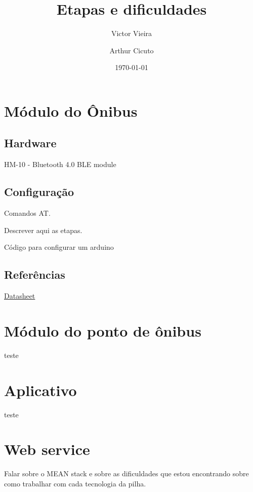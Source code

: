 \documentclass[a4paper, 12pt]{article}
\title{Etapas e dificuldades}
\author{Victor Vieira}
\author{Arthur Cicuto}
\date{\today}
\begin{document}
\maketitle

\section{Módulo do Ônibus}

\subsection{Hardware}

HM-10 - Bluetooth 4.0 BLE module

\subsection{Configuração}

Comandos AT.

Descrever aqui as etapas.

Código para configurar um arduino



\subsection{Referências}

\href{ftp://imall.iteadstudio.com/Modules/IM130614001_Serial_Port_BLE_Module_Master_Slave_HM-10/DS_IM130614001_Serial_Port_BLE_Module_Master_Slave_HM-10.pdf}{Datasheet}

\section{Módulo do ponto de ônibus}

teste

\section{Aplicativo}

teste

\section{Web service}

Falar sobre o MEAN stack e sobre as dificuldades que estou encontrando sobre como trabalhar com cada tecnologia da pilha.
\end{document}
